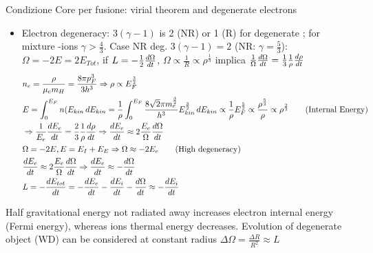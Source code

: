 \begin{frame}{Condizione Core per fusione: virial theorem and degenerate electrons}
    \begin{itemize}
        \item Electron degeneracy: $3(\gamma-1)$ is 2 (NR) or 1 (R) for degenerate \Pelectron; for mixture \Pelectron-ions $\gamma>\frac{4}{3}$. Case NR \Pelectron deg. $3(\gamma-1)=2$  (NR: $\gamma=\frac{5}{3}$): $\Omega=-2E=2E_{Tot}$, if $L=-\frac{1}{2}\TDy{t}{\Omega}$, $\Omega\propto \frac{1}{R}\propto\rho^{\frac{1}{3}}$ implica $\frac{1}{\Omega}\TDy{t}{\Omega}=\frac{1}{3}\frac{1}{\rho}\TDy{t}{\rho}$     
            \begin{align*}
                &n_e=\frac{\rho}{\mu_em_H}=\frac{8\pi p_F^3}{3h^3}\Rightarrow\rho\propto E_F^{\frac{3}{2}}\\
                &E=\int_0^{E_F}n(E_{kin}\,dE_{kin}=\frac{1}{\rho}\int_0^{E_F}\frac{8\sqrt{2}\pi m_e^{\frac{3}{2}}}{h^3}E_{kin}^{\frac{3}{2}}\,dE_{kin}\propto \frac{1}{\rho}E_F^{\frac{5}{2}}\propto \frac{\rho^{\frac{5}{3}}}{\rho}\propto\rho^{\frac{2}{3}}\tag{Internal Energy}\\
                &\Rightarrow \frac{1}{E_e}\TDy{t}{E_e}=\frac{2}{3}\frac{1}{\rho}\TDy{t}{\rho}\Rightarrow\TDy{t}{E_e}\approx2 \frac{E_e}{\Omega}\TDy{t}{\Omega}\\
        &\Omega=-2E, E=E_I+E_E\Rightarrow \Omega\approx-2E_e\tag{High degeneracy}\\
        &\TDy{t}{E_e}\approx2 \frac{E_e}{\Omega}\TDy{t}{\Omega}\Rightarrow\TDy{t}{E_e}\approx-\TDy{t}{\Omega}\\
        &L=-\TDy{t}{E_{tot}}=-\TDy{t}{E_e}-\TDy{t}{E_i}-\TDy{t}{\Omega}\approx-\TDy{t}{E_i}
            \end{align*}
    \end{itemize}
    Half gravitational energy not radiated away increases electron internal energy (Fermi energy), whereas ions thermal energy decreases. Evolution of degenerate object (WD) can be considered at constant radius $\Delta\Omega=\frac{\Delta R}{R^2}\approx L$
\end{frame}

